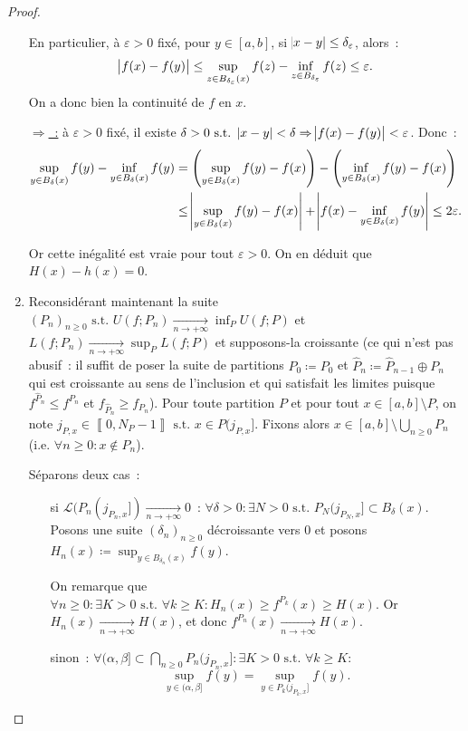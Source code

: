 \documentclass{article}
\newcommand{\pinfty}{{+\infty}}
\newcommand{\st}{\text{ s.t. }}
\newcommand{\intint}[2]{\left\llbracket#1, #2\right\rrbracket}
\begin{document}
\begin{proof}
\begin{enumerate}
	En particulier, à $\varepsilon > 0$ fixé, pour $y \in [a, b]$, si $\abs {x-y} \leq \delta_\varepsilon$, alors~:
	\[\abs {f(x)-f(y)} \leq \sup_{z \in B_{\delta_\varepsilon}(x)}f(z) - \inf_{z \in B_{\delta_\varepsilon}}f(z) \leq \varepsilon.\]
	On a donc bien la continuité de $f$ en $x$.

	\underline {$\Rightarrow$~:} à $\varepsilon > 0$ fixé, il existe $\delta > 0 \st \abs {x-y} < \delta \Rightarrow \abs {f(x)-f(y)} < \varepsilon$. Donc~:
	\begin{align*}
		\sup_{y \in B_\delta(x)}f(y) - \inf_{y \in B_\delta(x)}f(y) &= \left(\sup_{y \in B_\delta(x)}f(y) - f(x)\right) - \left(\inf_{y \in B_\delta(x)}f(y) - f(x)\right) \\
		&\leq \abs {\sup_{y \in B_\delta(x)}f(y)-f(x)} + \abs {f(x)-\inf_{y \in B_\delta(x)}f(y)} \leq 2\varepsilon.
	\end{align*}

	Or cette inégalité est vraie pour tout $\varepsilon > 0$. On en déduit que $H(x)-h(x) = 0$.

	\item Reconsidérant maintenant la suite $(P_n)_{n \geq 0} \st U(f; P_n) \xrightarrow[n \to \pinfty]{} \inf_PU(f; P)$ et $L(f; P_n) \xrightarrow[n \to \pinfty]{} \sup_PL(f; P)$
	et supposons-la croissante (ce qui n'est pas abusif~: il suffit de poser la suite de partitions $\hat P_0 \coloneqq P_0$ et $\hat P_n \coloneqq \hat P_{n-1} \oplus P_n$
	qui est croissante au sens de l'inclusion et qui satisfait les limites puisque $f^{\hat P_n} \leq f^{P_n}$ et $f_{\hat P_n} \geq f_{P_n}$).
	Pour toute partition $P$ et pour tout $x \in [a, b] \setminus P$, on note $j_{P,x} \in \intint 0{N_P-1} \st x \in P(j_{P,x}]$. Fixons alors $x \in [a, b] \setminus
	\bigcup_{n \geq 0}P_n$ (i.e. $\forall n \geq 0 : x \not \in P_n$).

	Séparons deux cas~:
	\begin{itemize}
		\item[{si $\mathcal L(P_n(j_{P_n,x}]) \xrightarrow[n \to \pinfty]{} 0$}~:] $\forall \delta > 0 : \exists N > 0 \st P_N(j_{P_N,x}] \subset B_\delta(x)$.
		Posons une suite $(\delta_n)_{n \geq 0}$ décroissante vers 0 et posons $H_n(x) \coloneqq \sup_{y \in B_{\delta_n}(x)}f(y)$.

		On remarque que $\forall n \geq 0 : \exists K > 0 \st \forall k \geq K : H_n(x) \geq f^{P_k}(x) \geq H(x)$. Or $H_n(x) \xrightarrow[n \to \pinfty]{} H(x)$, et donc
		$f^{P_n}(x) \xrightarrow[n \to \pinfty]{} H(x)$.

		\item[sinon~:] $\forall (\alpha, \beta] \subset \bigcap_{n \geq 0}P_n(j_{P_n, x}] : \exists K > 0 \st \forall k \geq K :$
		\[\sup_{y \in (\alpha, \beta]}f(y) = \sup_{y \in P_k(j_{P_k, x}]}f(y).\]


\end{itemize}
\end{enumerate}
\end{proof}
\end{document}
